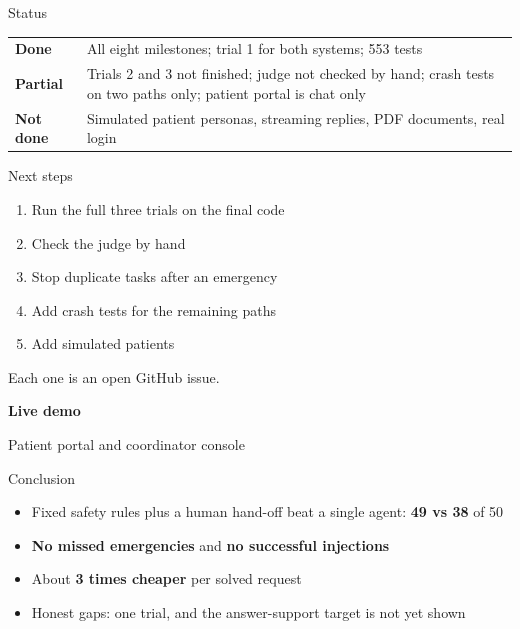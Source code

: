 \documentclass[aspectratio=169,12pt]{beamer}
\begin{document}
\begin{frame}{Status}
\begin{tabular}{@{}p{}p{}@{}}
\textbf{\color{good}Done} & All eight milestones; trial 1 for both systems; 553 tests \\[8pt]
\textbf{\color{warn}Partial} & Trials 2 and 3 not finished; judge not checked by hand; crash tests on two paths only; patient portal is chat only \\[8pt]
\textbf{\color{red!70!black}Not done} & Simulated patient personas, streaming replies, PDF documents, real login \\
\end{tabular}
\end{frame}

\begin{frame}{Next steps}
\begin{enumerate}\setlength\itemsep{9pt}
\item Run the full three trials on the final code
\item Check the judge by hand
\item Stop duplicate tasks after an emergency
\item Add crash tests for the remaining paths
\item Add simulated patients
\end{enumerate}
\vspace{2mm}
{\small Each one is an open GitHub issue.}
\end{frame}

\begin{frame}[plain]
\centering\vspace{2.2cm}
{\color{customblue}\fontsize{34}{40}\selectfont\bfseries Live demo\par}\vspace{4mm}
{\Large Patient portal and coordinator console\par}
\end{frame}

\begin{frame}{Conclusion}
\begin{itemize}\setlength\itemsep{10pt}
\item Fixed safety rules plus a human hand-off beat a single agent: \textbf{49 vs 38} of 50
\item \textbf{No missed emergencies} and \textbf{no successful injections}
\item About \textbf{3 times cheaper} per solved request
\item Honest gaps: one trial, and the answer-support target is not yet shown
\end{itemize}
\vspace{6mm}
\end{frame}
\end{document}
